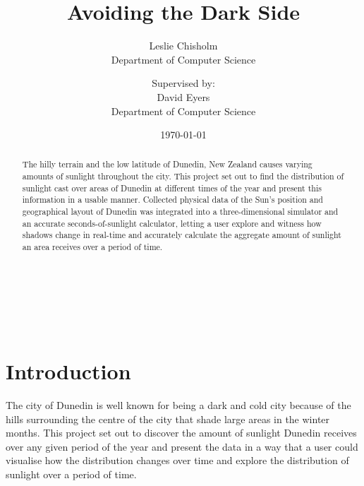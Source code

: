 \documentclass[12pt]{report}
\title{Avoiding the Dark Side}
\author{
        Leslie Chisholm \\
                Department of Computer Science\\
                \and
                Supervised by:\\
                David Eyers\\
                Department of Computer Science\\
}
\date{\today}
\newcommand{\note}[1]{}
\newcommand{\notedme}[1]{}
\begin{document}
\maketitle


\begin{abstract}
\notedme{Thanks for the chapter title changes - I really do think they're better like you've made them! The same can be said for subsections like ``Sun'' though... ;-)}\note{ok I've changed the Sun subsection }\notedme{I said ``subsections like'' not ``the  Sun subsection'' - there are others but it's not a big problem.}

\notedme{Did the ``suburb'' masking code end up making it? I don't think the figures show anything but sun over the whole area. It would be great to have a table that shows a quantitive difference between Peninsula and North Valley sunlight over June, for example. Even if the code was nearly ready but not finished, it might be worth mentioning it, as being able to quantitatively compare the amount of sun between selected areas of the map would be a good extension.}
\note{It ``sort of'' made it in. To find the aggregate amount of sunlight a suburb receives you can mask out sections of map that are outside of the suburb and they won't be returned. Exporting this to a CVS file and taking the average sunlight of that area would be the ideal way to do it and could be compared to other sections. I've created a section in the aggregator describing comparisons between suburbs.}\notedme{Yes, I like the new section, and think it makes sense it's there.}

\notedme{I didn't spell-check, but make sure you do before submitting it, obviously.}\note{Spell check done}

The hilly terrain and the low latitude of Dunedin, New Zealand causes varying amounts of sunlight throughout the city. This project set out to find the distribution of sunlight cast over areas of Dunedin at different times of the year and present this information in a usable manner. Collected physical data of the Sun's position and geographical layout of Dunedin was integrated into a three-dimensional simulator and an accurate seconds-of-sunlight calculator, letting a user explore and witness how shadows change in real-time and accurately calculate the aggregate amount of sunlight an area receives over a period of time.
\end{abstract}

\tableofcontents
\listoffigures\
\listoftables\
\listofalgorithms
\chapter{Introduction}
The city of Dunedin is well known for being a dark and cold city because of the hills surrounding the centre of the city that shade large areas in the winter months. This project set out to discover the amount of sunlight Dunedin receives over any given period of the year and present the data in a way that a user could visualise how the distribution changes over time and explore the distribution of sunlight over a period of time.
\end{document}
